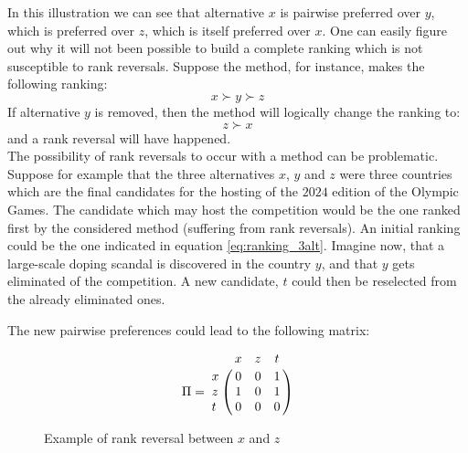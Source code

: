 \documentclass[conference,compsoc]{IEEEtran}
\begin{document}
In this illustration we can see that alternative $x$ is pairwise preferred over $y$, which is preferred over $z$, which is itself preferred over $x$.
One can easily figure out why it will not been possible to build a complete ranking which is not susceptible to rank reversals. 
Suppose the method, for instance, makes the following ranking:
\begin{equation}
  x \succ y \succ z
  \label{eq:ranking_3alt}
\end{equation}
If alternative $y$ is removed, then the method will logically change the ranking to:
\begin{equation}
  z \succ x 
\end{equation}
and a rank reversal will have happened.\\

The possibility of rank reversals to occur with a method can be problematic. 
Suppose for example that the three alternatives $x$, $y$ and $z$ were three countries which are the final candidates for the hosting of the $2024$ edition of the Olympic Games. 
The candidate which may host the competition would be the one ranked first by the considered method (suffering from rank reversals). An initial ranking could be the one indicated in equation \ref{eq:ranking_3alt}. 
Imagine now, that a large-scale doping scandal is discovered in the country $y$, and that $y$ gets eliminated of the competition. A new candidate, $t$ could then be reselected from the already eliminated ones.

The new pairwise preferences could lead to the following matrix:

\begin{figure}[h]
\begin{minipage}{.2\textwidth}
    \begin{equation*}
        \Pi   = \bordermatrix{~ & x    & z    & t   \cr
                            x & 0    & 0    & 1   \cr
                            z & 1    & 0    & 1   \cr
                            t & 0    & 0    & 0   \cr}
    \end{equation*}
\end{minipage}
\begin{minipage}{.2\textwidth}
    \begin{center}
   \end{center}
\end{minipage}%
\caption{Example of rank reversal between $x$ and $z$}
\label{fig:transitive_pref_example}
\end{figure}
\end{document}

